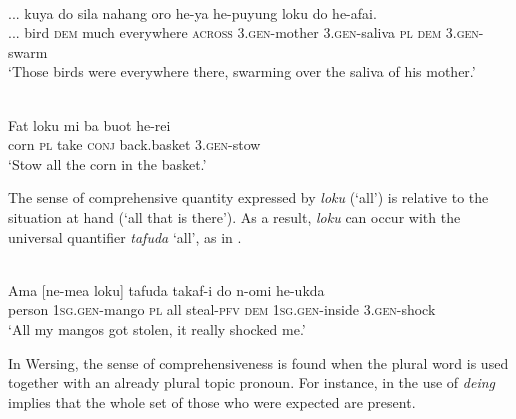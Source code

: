 \ea%
\label{ex:9:69}
 \\
\gll  ... {kuya} do sila nahang oro  he-ya he-puyung loku do he-afai. \\
   ...  bird \textsc{dem} much everywhere \textsc{across}   \textsc{3.gen}-mother \textsc{3.gen-}saliva \textsc{pl} \textsc{dem} \textsc{3.gen-}swarm \\
\glt `Those birds were everywhere there, swarming over the saliva of his mother.'
\z













\ea%
\label{ex:9:70}
 \\
\gll  Fat loku mi ba buot he-rei \\
    corn \textsc{pl} take \textsc{conj} back.basket \textsc{3.gen-}stow \\
\glt `Stow all the corn in the basket.'
\z






The sense of comprehensive quantity expressed by \textit{loku} (`all') is relative to the situation at hand (`all that is there'). As a result, \textit{loku} can occur with the universal quantifier \textit{tafuda} `all', as in .



\ea%
\label{ex:9:71}
 \\
\gll  Ama [ne-mea loku] tafuda takaf-i  do n-omi he-ukda \\
    person \textsc{1sg.gen-}mango \textsc{pl} all steal-\textsc{pfv}  \textsc{dem} \textsc{1sg.gen-}inside 3.\textsc{gen-}shock \\
\glt `All my mangos got stolen,  it really shocked me.' %
\z












In Wersing, the sense of comprehensiveness is found when the plural word is used together with an already plural topic pronoun. For instance, in  the use of \textit{deing} implies that the whole set of those who were expected are present.


